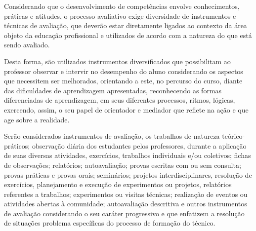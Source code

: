 Considerando que o desenvolvimento de competências envolve conhecimentos, práticas e atitudes, o processo avaliativo exige diversidade de instrumentos e técnicas de avaliação, que deverão estar diretamente ligados ao contexto da área objeto da educação profissional e utilizados de acordo com a natureza do que está sendo avaliado.

Desta forma, são utilizados instrumentos diversificados que possibilitam ao professor observar e intervir no desempenho do aluno considerando os aspectos que necessitem ser melhorados, orientando a este, no percurso do curso, diante das dificuldades de aprendizagem apresentadas, reconhecendo as formas diferenciadas de aprendizagem, em seus diferentes processos, ritmos, lógicas, exercendo, assim, o seu papel de orientador e mediador que reflete na ação e que age sobre a realidade. 

Serão considerados instrumentos de avaliação, os trabalhos de natureza teórico-práticos; observação diária dos estudantes pelos professores, durante a aplicação de suas diversas atividades, exercícios, trabalhos individuais e/ou coletivos; fichas de observações; relatórios; autoavaliação; provas escritas com ou sem consulta; provas práticas e provas orais; seminários; projetos interdisciplinares, resolução de exercícios, planejamento e execução de experimentos ou projetos, relatórios referentes a trabalhos; experimentos ou visitas técnicas; realização de eventos ou atividades abertas à comunidade; autoavaliação descritiva e outros instrumentos de avaliação considerando o seu caráter progressivo e que enfatizem a resolução de situações problema específicas do processo de formação do técnico.

